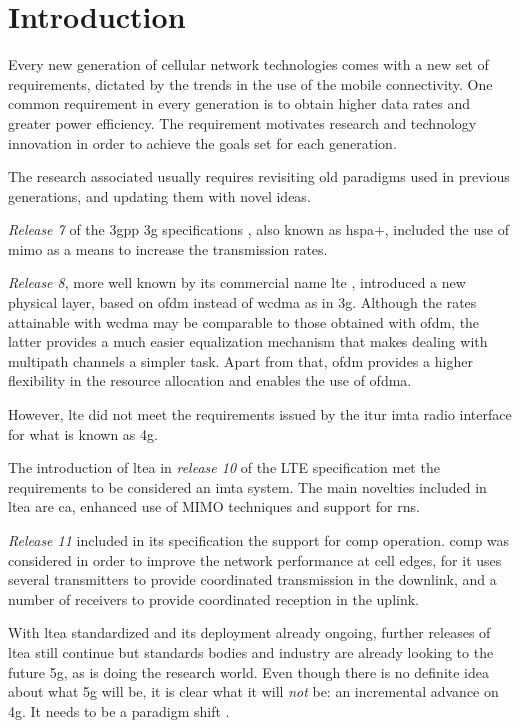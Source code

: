 \chapter{Introduction}\label{ch:intro}

Every new generation of cellular network technologies comes with a new set of
requirements, dictated by the trends in the use of the mobile connectivity. One
common requirement in every generation is to obtain higher data rates and
greater power efficiency. The requirement motivates research and technology
innovation in order to achieve the goals set for each generation.

The research associated usually requires revisiting old paradigms used in
previous generations, and updating them with novel ideas.


\emph{Release 7} of the \gls{3gpp} \gls{3g} specifications \cite{3gpprel7},
also known as \gls{hspa+}, included the use of \gls{mimo} as a means to increase
the transmission rates.


\emph{Release 8}, more well known by its commercial name \gls{lte}
\cite{3gpplte}, introduced a new physical layer, based on \gls{ofdm} instead of
\gls{wcdma} as in \gls{3g}. Although the rates attainable with \gls{wcdma} may
be comparable to those obtained with \gls{ofdm}, the latter provides a much
easier equalization mechanism that makes dealing with multipath channels a
simpler task. Apart from that, \gls{ofdm} provides a higher flexibility in the
resource allocation and enables the use of \gls{ofdma}.

However, \gls{lte} did not meet the requirements issued by the \gls{itur}
\gls{imta} radio interface \cite{imta} for what is known as \gls{4g}.

The introduction of \gls{ltea} in \emph{release 10} of the LTE specification
\cite{3gppltea} met the requirements to be considered an \gls{imta} system. The
main novelties included in \gls{ltea} are \gls{ca}, enhanced use of MIMO
techniques and support for \glspl{rn}.

\emph{Release 11} \cite{3gpprel11} included in its specification the support for
\gls{comp} operation. \gls{comp} was considered in order to improve the network
performance at cell edges, for it uses several transmitters to provide
coordinated transmission in the downlink, and a number of receivers to provide
coordinated reception in the uplink.

With \gls{ltea} standardized and its deployment already ongoing, further
releases of \gls{ltea} still continue but standards bodies and industry are
already looking to the future \gls{5g}, as is doing the research world. Even
though there is no definite idea about what \gls{5g} will be, it is clear what
it will \emph{not} be: an incremental advance on \gls{4g}. It needs to be a
paradigm shift \cite{andrews14}.

